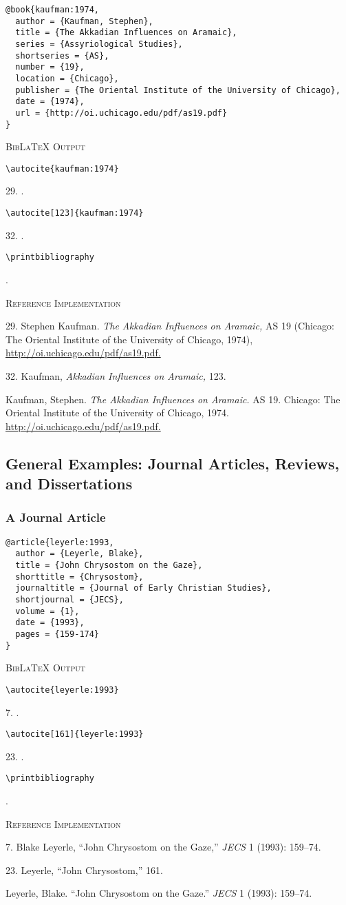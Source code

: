\documentclass[a4paper]{article}
\newcommand\citetestnpf[4]{%
  {\textsc{BibLaTeX Output}\par
   \nobreak
   \texttt{\textbackslash autocite\{#4\}}\par
   \color{biblatex-colour}
   #1. \cite{#4}.\par
   \color{black}
   \texttt{\textbackslash autocite[#3]\{#4\}}\par
   \color{biblatex-colour}
   #2. \cite[#3]{#4}.\par
   \color{black}
   \texttt{\textbackslash printbibliography}\par
   \color{biblatex-colour}
   \hangindent\bibindent\bibentrycite{#4}.\par}}
\newenvironment{refimp}{%
  \begin{minipage}{\linewidth}
    \setlength{\parskip}{1ex}
    \textsc{Reference Implementation}\par
    \nobreak
    \color{reference-colour}
}{\end{minipage}}
\begin{document}
\begin{lstlisting}
@book{kaufman:1974,
  author = {Kaufman, Stephen},
  title = {The Akkadian Influences on Aramaic},
  series = {Assyriological Studies},
  shortseries = {AS},
  number = {19},
  location = {Chicago},
  publisher = {The Oriental Institute of the University of Chicago},
  date = {1974},
  url = {http://oi.uchicago.edu/pdf/as19.pdf}
}
\end{lstlisting}

\citetestnpf{29}{32}{123}{kaufman:1974}

\begin{refimp}
  29. Stephen Kaufman. \emph{The Akkadian Influences on Aramaic,} AS 19
  (Chicago: The Oriental Institute of the University of Chicago, 1974),
  \url{http://oi.uchicago.edu/pdf/as19.pdf.}

  32. Kaufman, \emph{Akkadian Influences on Aramaic,} 123.

  \hangindent\bibindent Kaufman, Stephen. \emph{The Akkadian Influences on
  Aramaic.} AS 19. Chicago: The Oriental Institute of the University of
  Chicago, 1974. \url{http://oi.uchicago.edu/pdf/as19.pdf.}
\end{refimp}

\subsection{General Examples: Journal Articles, Reviews, and Dissertations}

\subsubsection{A Journal Article}

\begin{lstlisting}
@article{leyerle:1993,
  author = {Leyerle, Blake},
  title = {John Chrysostom on the Gaze},
  shorttitle = {Chrysostom},
  journaltitle = {Journal of Early Christian Studies},
  shortjournal = {JECS},
  volume = {1},
  date = {1993},
  pages = {159-174}
}
\end{lstlisting}  

\citetestnpf{7}{23}{161}{leyerle:1993}

\begin{refimp}
  7. Blake Leyerle, “John Chrysostom on the Gaze,” \emph{JECS} 1 (1993): 159–74.

  23. Leyerle, “John Chrysostom,” 161.

  \hangindent\bibindent Leyerle, Blake. “John Chrysostom on the Gaze.”
  \emph{JECS} 1 (1993): 159–74.
\end{refimp}
\end{document}
